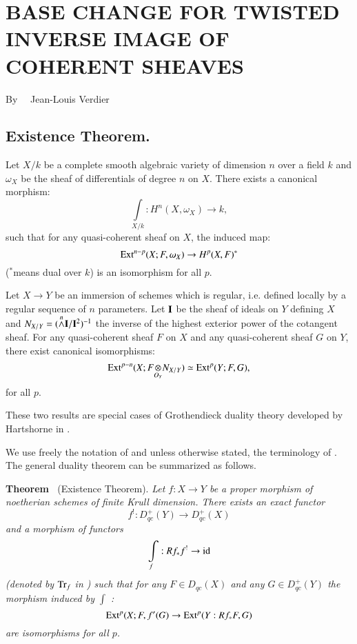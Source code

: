 \chapter[\textsc{J.-L. Verdier~:} Base Change for Twisted Inverse Image of Coherent Sheaves]{BASE CHANGE FOR TWISTED INVERSE IMAGE OF COHERENT SHEAVES}\label{art20}

\begin{center}
By~~ Jean-Louis Verdier
\end{center}

\setcounter{pageoriginal}{392}
\section{Existence Theorem.}\label{art20-sec1}
\pageoriginale


Let $X/k$ be a complete smooth algebraic variety of dimension $n$ over a field $k$ and $\omega_{X}$ be the sheaf of differentials of degree $n$ on $X$. There exists a canonical morphism:
$$
\int\limits_{X/k}:H^{n}(X,\omega_{X})\to k,
$$
such that for any quasi-coherent sheaf on $X$, the induced map:
$$
\operatorname{\mathrm{Ext}}^{n-p}(X;F,\omega_{X})\to H^{p}(X,F)^{*}
$$
($^{*}$means dual over $k$) is an isomorphism for all $p$.

Let $X\to Y$ be an immersion of schemes which is regular, i.e. defined locally by a regular sequence of $n$ parameters. Let $\mathbf{I}$ be the sheaf of ideals on $Y$ defining $X$ and $N_{X/Y}=({\displaystyle{\mathop{\wedge}\limits^{n}}}\mathbf{I}/\mathbf{I}^{2})^{-1}$ the inverse of the highest exterior power of the cotangent sheaf. For any quasi-coherent sheaf $F$ on $X$ and any quasi-coherent sheaf $G$ on $Y$, there exist canonical isomorphisms:
$$
\Ext^{p-n}(X;\foprod{F}{N_{X/Y}}{O_{Y}})\simeq \Ext^{p}(Y;F,G),
$$
for all $p$.

These two results are special cases of Grothendieck duality theory developed by Hartshorne in \cite{art20-key1}.

We use freely the notation of \cite{art20-key1} and unless otherwise stated, the terminology of \cite{art20-key1}. The general duality theorem can be summarized as follows.

\medskip
\noindent
{\bf Theorem \label{art20-thm1}}~(Existence Theorem).
{\em Let $f:X\to Y$ be a proper morphism of noetherian schemes of finite Krull dimension. There exists an exact functor}
$$
f^{!}:D^{+}_{qc}(Y)\to D^{+}_{qc}(X)
$$
{\em and a morphism of functors}
$$
\int\limits_{f}:Rf_{*}f^{!}\to \operatorname{\mathrm{id}}
$$\pageoriginale
{\em (denoted by $\operatorname{\mathrm{Tr}}_{f}$ in \cite{art20-key1}) such that for any $F\in D_{qc}(X)$ and any $G\in D^{+}_{qc}(Y)$ the morphism induced by $\int$ :}
$$
\operatorname{\mathrm{Ext}}^{p}(X;F,f'(G)\to \operatorname{\mathrm{Ext}}^{p}(Y:Rf_{*}F,G)
$$
{\em are isomorphisms for all $p$.}
\smallskip

